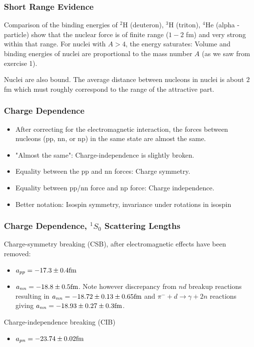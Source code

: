 \documentclass[compress]{beamer}
\begin{document}
\frame
{
\frametitle{Short Range Evidence}
Comparison of the binding energies of
$^2$H (deuteron), $^3$H (triton), $^4$He (alpha - particle)
  show that the nuclear force is of finite range ($1-2$ fm) and
  very strong within that range.
For nuclei with $A>4$, the energy saturates: Volume
  and binding energies of nuclei are proportional to the
  mass number $A$ (as we saw from exercise 1).

Nuclei are also bound. The average distance
between nucleons in nuclei is about $2$ fm which
must roughly correspond to the range of the
attractive part.
} 


\frame
{
\frametitle{Charge Dependence}
\begin{itemize}
\item  After correcting for the electromagnetic interaction, the forces
  between nucleons (pp, nn, or np) in the same state are almost the
  same.
\item  "Almost the same": Charge-independence is slightly broken.
\item  Equality between the pp and nn forces: Charge symmetry.
\item  Equality between pp/nn force and np force: Charge independence.
\item Better notation: Isospin symmetry, invariance under rotations in isospin
\end{itemize}
} 



\frame
{
\frametitle{Charge Dependence, $^1S_0$ Scattering Lengths}
Charge-symmetry breaking (CSB), after electromagnetic effects
have been removed:
\begin{itemize}
\item $a_{pp}=  -17.3 \pm 0.4 \hspace{0.cm} \mathrm{fm}$
\item $a_{nn}=-18.8 \pm 0.5 \hspace{0.cm} \mathrm{fm}$. Note however discrepancy from $nd$ breakup reactions
resulting in  $a_{nn}=-18.72 \pm 0.13 \pm 0.65 \hspace{0.cm} \mathrm{fm}$
and $\pi^- + d \rightarrow \gamma + 2n$ reactions giving  $a_{nn}=-18.93 \pm 0.27 \pm 0.3 \hspace{0.cm} \mathrm{fm}$.
\end{itemize}
Charge-independence breaking (CIB)
\begin{itemize}
\item $a_{pn}=  -23.74 \pm 0.02 \hspace{0.cm} \mathrm{fm}$ 
\end{itemize}
} 
\end{document}
